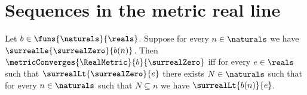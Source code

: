




\section{Sequences in the metric real line}

\begin{theorem}\label{nonnegative_real_sequence_converges_zero_iff_eventually_below}
    Let $b\in\funs{\naturals}{\reals}$.
    Suppose for every $n\in\naturals$ we have
        $\surrealLe{\surrealZero}{b(n)}$.
    Then $\metricConverges{\RealMetric}{b}{\surrealZero}$ iff
        for every $e\in\reals$ such that
            $\surrealLt{\surrealZero}{e}$ there exists $N\in\naturals$
            such that for every $n\in\naturals$ such that $N\subseteq n$
                we have $\surrealLt{b(n)}{e}$.
\end{theorem}
